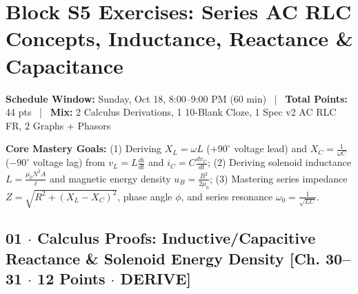 \documentclass[10pt,letterpaper]{article}
\begin{document}
\section*{Block S5 Exercises: Series AC RLC Concepts, Inductance, Reactance \& Capacitance}

  \textbf{Schedule Window:} Sunday, Oct 18, 8:00--9:00 PM (60 min) ~|~
  \textbf{Total Points:} 44 pts ~|~
  \textbf{Mix:} 2 Calculus Derivations, 1 10-Blank Cloze, 1 Spec v2 AC RLC FR, 2 Graphs + Phasors



  \textbf{Core Mastery Goals:} (1) Deriving $X_L = \omega L$ ($+90^\circ$ voltage lead) and $X_C = \frac{1}{\omega C}$ ($-90^\circ$ voltage lag) from $v_L = L\frac{di}{dt}$ and $i_C = C\frac{dv_C}{dt}$; (2) Deriving solenoid inductance $L = \frac{\mu_0 N^2 A}{\ell}$ and magnetic energy density $u_B = \frac{B^2}{2\mu_0}$; (3) Mastering series impedance $Z = \sqrt{R^2 + (X_L - X_C)^2}$, phase angle $\phi$, and series resonance $\omega_0 = \frac{1}{\sqrt{LC}}$.


\subsection*{01 $\cdot$ Calculus Proofs: Inductive/Capacitive Reactance \& Solenoid Energy Density \hfill [Ch. 30--31 $\cdot$ 12 Points $\cdot$ DERIVE]}
\end{document}
